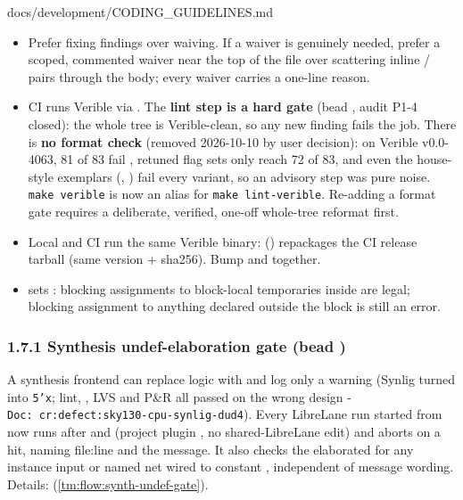 \begin{relocated}{docs/development/CODING_GUIDELINES.md}
\begin{itemize}
\tightlist
\item
  Prefer fixing findings over waiving. If a waiver is genuinely needed,
  prefer a scoped, commented waiver near the top of the file over
  scattering inline / pairs through the
  body; every waiver carries a one-line reason.
\item
  CI runs Verible via . The
  \textbf{lint step is a hard gate} (bead , audit P1-4
  closed): the whole tree is Verible-clean, so any new finding fails the
  job. There is \textbf{no format check} (removed 2026-10-10 by user
  decision): on Verible v0.0-4063, 81 of 83  fail
  , retuned flag sets only reach 72 of 83, and even the
  house-style exemplars (,
  ) fail every variant, so an advisory step was
  pure noise. \texttt{make\ verible} is now an alias for
  \texttt{make\ lint-\allowbreak{}verible}. Re-adding a format gate
  requires a deliberate, verified, one-off whole-tree reformat first.
\item
  Local and CI run the same Verible binary: 
  () repackages the CI release tarball (same version +
  sha256). Bump  and  together.
\item
   sets
  : blocking
  assignments to block-local temporaries inside  are
  legal; blocking assignment to anything declared outside the block is
  still an error.
\end{itemize}

\subsubsection{\texorpdfstring{1.7.1 Synthesis undef-elaboration gate
(bead )}{1.7.1 Synthesis undef-elaboration gate (bead )}}\label{um:guide:coding-guidelines:171-synthesis-undef-elaboration-gate-bead-gc0y}

A synthesis frontend can replace logic with  and log only a
warning (Synlig turned  into
\texttt{5'x}; lint, , LVS and P\&R all
passed on the wrong design -
\texttt{Doc:\allowbreak{}\ cr:\allowbreak{}defect:\allowbreak{}sky130-\allowbreak{}cpu-\allowbreak{}synlig-\allowbreak{}dud4}).
Every LibreLane run started from  now runs
 after  and
 (project plugin
, no shared-LibreLane
edit) and aborts on a hit, naming file:line and the message. It also
checks the elaborated  for any instance input or named
net wired to constant , independent of message wording. Details:
 (\cref{tm:flow:synth-undef-gate}).


\end{relocated}
